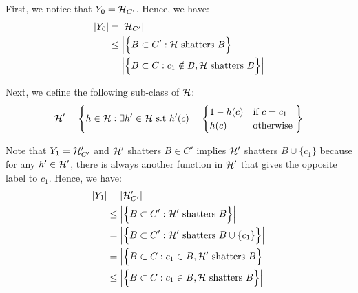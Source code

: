 \begin{proof*}
\begin{itemize}
        \noindent First, we notice that $Y_0 = \mathcal{H}_{C'}$. Hence, we have:
        \begin{align*}
            |Y_0| &= |\mathcal{H}_{C'}| \\
                &\le \Big| 
                    \Big\{ 
                        B \subset C' : \mathcal{H} \text{ shatters } B
                     \Big\}
                 \Big| \\
                &= \Big| 
                    \Big\{ 
                        B \subset C : c_1 \notin B, \mathcal{H} \text{ shatters } B
                     \Big\}
                 \Big|
        \end{align*}

        \noindent Next, we define the following sub-class of $\mathcal{H}$:
        \begin{align*}
            \mathcal{H}' = \Bigg\{ 
                h \in \mathcal{H} : \exists h' \in \mathcal{H} \text{ s.t } h'(c) = \begin{cases}
                    1 - h(c) &\text{if } c=c_1
                    \\
                    h(c) &\text{otherwise}
                \end{cases} 
             \Bigg\}
        \end{align*}

        \noindent Note that $Y_1 = \mathcal{H}'_{C'}$ and $\mathcal{H}'$ shatters $B\in C'$ implies $\mathcal{H}'$ shatters $B\cup\{c_1\}$ because for any $h'\in\mathcal{H}'$, there is always another function in $\mathcal{H}'$ that gives the opposite label to $c_1$. Hence, we have:
        \begin{align*}
            |Y_1| &= |\mathcal{H}'_{C'}| \\
                &\le \Big| 
                    \Big\{ 
                        B \subset C' : \mathcal{H}' \text{ shatters } B
                     \Big\}
                 \Big| \\
                &= \Big| 
                    \Big\{ 
                        B \subset C' : \mathcal{H}' \text{ shatters } B \cup \{c_1\}
                     \Big\}
                 \Big| \\
                &= \Big| 
                    \Big\{ 
                        B \subset C : c_1\in B, \mathcal{H}' \text{ shatters } B
                     \Big\}
                 \Big| \\
                &\le \Big| 
                    \Big\{ 
                        B \subset C : c_1\in B, \mathcal{H} \text{ shatters } B
                     \Big\}
                 \Big| 
        \end{align*}


\end{itemize}
\end{proof*}
